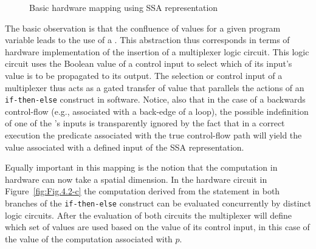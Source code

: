 \begin{figure}[htbp]
  \centering
\caption{Basic hardware mapping using SSA representation}
\label{fig:Fig.4.2}
\end{figure}

The basic observation is that the confluence of values for a given program variable leads to the use of a \phifun. This \phifun abstraction thus corresponds in terms of hardware implementation of the insertion of a multiplexer logic circuit. This logic circuit uses the Boolean value of a control input to select which of its 
input's value is to be propagated to its output. The selection or control input of 
a multiplexer thus acts as a gated transfer of value that parallels the actions of 
an {\tt if-then-else} construct in software. Notice, also that in the case of a backwards control-flow (e.g., associated with a back-edge of a loop),  the possible indefinition of one of the  \phifun's inputs is transparently ignored by the fact that in a correct execution the predicate associated with the true control-flow path will yield the value associated with a defined input of the SSA representation.

Equally important in this mapping is the notion that the computation in hardware can now take a spatial dimension.  In the hardware circuit in Figure~\ref{fig:Fig.4.2-c} the computation derived from the statement in both branches of the {\tt if-then-else} construct can be evaluated concurrently by distinct logic circuits.  After the evaluation of both circuits the multiplexer will define which set of values are used based on the value of its control input, in this case of the value of the computation associated with $p$.

